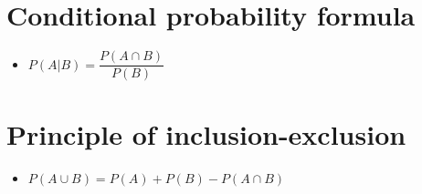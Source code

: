 \section{Conditional probability formula}
\begin{itemize}
    \item $P(A|B) = \dfrac{P(A \cap B)}{P(B)}$
\end{itemize}
\section{Principle of inclusion-exclusion}
\begin{itemize}
    \item $P(A\cup B)=P(A)+P(B)-P(A\cap B)$
\end{itemize}